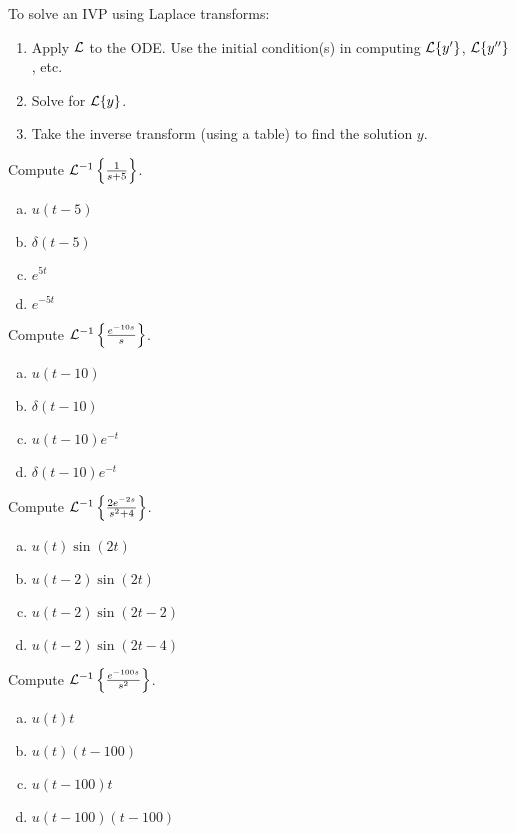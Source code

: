 \begin{applicationActivities}

\begin{observation}
To solve an IVP using Laplace transforms:
\begin{enumerate}[1)]
\item Apply \(\mathcal{L}\) to the ODE.  Use the initial condition(s) in computing \(\mathcal{L}\{y'\}\), \(\mathcal{L}\{y''\}\), etc.
\item Solve for \(\mathcal{L}\{y\}\).
\item Take the inverse transform (using a table) to find the solution \(y\).
\end{enumerate}
\end{observation}

\begin{activity}{5}
Compute \(\mathcal{L}^{-1} \left\{ \frac{1}{s+5}\right\} \).
\begin{enumerate}[(a)]
\item \(u(t-5)\)
\item \(\delta(t-5)\)
\item \(e^{5t}\)
\item \(e^{-5t}\)
\end{enumerate}
\end{activity}

\begin{activity}{5}
Compute \(\mathcal{L}^{-1} \left\{ \frac{e^{-10s}}{s}\right\} \).
\begin{enumerate}[(a)]
\item \(u(t-10)\)
\item \(\delta(t-10)\)
\item \(u(t-10)e^{-t}\)
\item \(\delta(t-10)e^{-t}\)
\end{enumerate}
\end{activity}




\begin{activity}{5}
Compute \(\mathcal{L}^{-1}\left\{\frac{2e^{-2s}}{s^2+4}\right\} \).
\begin{enumerate}[(a)]
\item \(u(t)\sin(2t)\)
\item \(u(t-2)\sin(2t)\)
\item \(u(t-2)\sin(2t-2)\)
\item \(u(t-2)\sin(2t-4)\)
\end{enumerate}
\end{activity}

\begin{activity}{5}
Compute \(\mathcal{L}^{-1} \left\{ \frac{e^{-100s}}{s^2}\right\} \).
\begin{enumerate}[(a)]
\item \(u(t)t\)
\item \(u(t)(t-100)\)
\item \(u(t-100)t\)
\item \(u(t-100)(t-100)\)
\end{enumerate}
\end{activity}




\end{applicationActivities}
